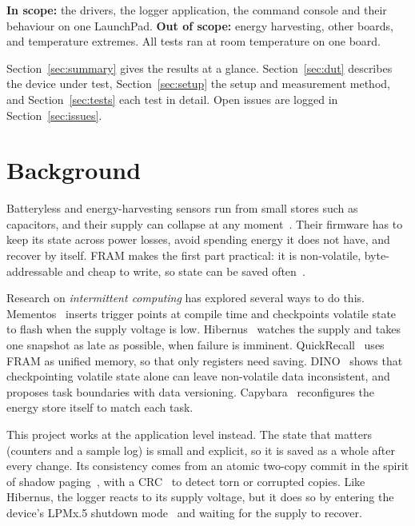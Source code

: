 \documentclass[11pt,a4paper]{article}
\begin{document}
\textbf{In scope:} the drivers, the logger application, the command console and their behaviour on one LaunchPad.
\textbf{Out of scope:} energy harvesting, other boards, and temperature extremes. All tests ran at room temperature on one board.

Section~\ref{sec:summary} gives the results at a glance. Section~\ref{sec:dut} describes the device under test, Section~\ref{sec:setup} the setup and measurement method, and Section~\ref{sec:tests} each test in detail. Open issues are logged in Section~\ref{sec:issues}.

\section{Background}

Batteryless and energy-harvesting sensors run from small stores such as capacitors, and their supply can collapse at any moment~\cite{hester2017future,lucia2017snapl}. Their firmware has to keep its state across power losses, avoid spending energy it does not have, and recover by itself. FRAM makes the first part practical: it is non-volatile, byte-addressable and cheap to write, so state can be saved often~\cite{jayakumar2014quickrecall}.

Research on \emph{intermittent computing} has explored several ways to do this. Mementos~\cite{ransford2011mementos} inserts trigger points at compile time and checkpoints volatile state to flash when the supply voltage is low. Hibernus~\cite{balsamo2015hibernus} watches the supply and takes one snapshot as late as possible, when failure is imminent. QuickRecall~\cite{jayakumar2014quickrecall} uses FRAM as unified memory, so that only registers need saving. DINO~\cite{lucia2015dino} shows that checkpointing volatile state alone can leave non-volatile data inconsistent, and proposes task boundaries with data versioning. Capybara~\cite{colin2018capybara} reconfigures the energy store itself to match each task.

This project works at the application level instead. The state that matters (counters and a sample log) is small and explicit, so it is saved as a whole after every change. Its consistency comes from an atomic two-copy commit in the spirit of shadow paging~\cite{lorie1977physical}, with a CRC~\cite{koopman2004crc} to detect torn or corrupted copies. Like Hibernus, the logger reacts to its supply voltage, but it does so by entering the device's LPMx.5 shutdown mode~\cite{ti_slau367} and waiting for the supply to recover.
\end{document}
